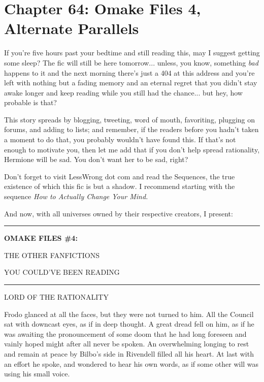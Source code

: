 \chapter{Chapter 64: Omake Files 4, Alternate Parallels}
If you're five hours past your bedtime and still reading this, may I
suggest getting some sleep? The fic will still be here tomorrow...
unless, you know, something \emph{bad} happens to it and the next
morning there's just a 404 at this address and you're left with nothing
but a fading memory and an eternal regret that you didn't stay awake
longer and keep reading while you still had the chance... but hey,
how probable is that?

This story spreads by blogging, tweeting, word of mouth, favoriting,
plugging on forums, and adding to lists; and remember, if the readers
before you hadn't taken a moment to do that, you probably wouldn't have
found this. If that's not enough to motivate you, then let me add that
if you don't help spread rationality, Hermione will be sad. You don't
want her to be sad, right?

Don't forget to visit LessWrong dot com and read the Sequences, the true
existence of which this fic is but a shadow. I recommend starting with
the sequence \emph{How to Actually Change Your Mind.}

And now, with all universes owned by their respective creators, I
present:

\begin{center}\rule{3in}{0.4pt}\end{center}

\textbf{OMAKE FILES \#4:}

THE OTHER FANFICTIONS

YOU COULD'VE BEEN READING

\begin{center}\rule{3in}{0.4pt}\end{center}

LORD OF THE RATIONALITY

Frodo glanced at all the faces, but they were not turned to him. All the
Council sat with downcast eyes, as if in deep thought. A great dread
fell on him, as if he was awaiting the pronouncement of some doom that
he had long foreseen and vainly hoped might after all never be spoken.
An overwhelming longing to rest and remain at peace by Bilbo's side in
Rivendell filled all his heart. At last with an effort he spoke, and
wondered to hear his own words, as if some other will was using his
small voice.

